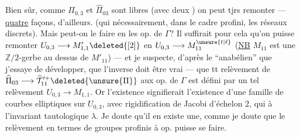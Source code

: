 
Bien sûr, comme $\Pi_{0,3}$ et $\widehat\Pi_{03}$ sont libres (avec deux ) on peut tjrs remonter ---  \uline{quatre} façons, d'ailleurs. (qui nécessairement, dans le cadre profini,  les réseaux discrets). Mais peut-on le faire en  les op. de $\Gamma$? Il suffirait pour cela qu'on puisse remonter $U_{0,3}\longrightarrow M'_{1,1}\deleted{[2]}$ en $U_{0,3}\longrightarrow M_{11}^{\unsure{t|\ell}}$ (\uline{NB} $M_{11}$ est une  $\mathbb Z/2$-gerbe au dessus de $M'_{11}$) --- et je suspecte, 
d'après le  ``anabélien'' que j'essaye de développer, que l'inverse doit être vrai --- que tt relèvement de $\widehat\Pi_{03}\longrightarrow\widehat{\mathcal T}_{11}^{\prime+}\deleted{\unsure{\Pi}}$  aux op. de $\Gamma$ est défini par un tel relèvement $U_{0,3}\longrightarrow M_{1,1}$. Or l'existence  signifierait  l'existence d'une famille de courbes elliptiques sur $U_{0,3}$, avec
rigidification de Jacobi d'échelon $2$, qui  à l'invariant tautologique $\lambda$. Je doute qu'il en existe une, comme je doute que le relèvement en termes de groupes profinis à op. puisse se faire.

